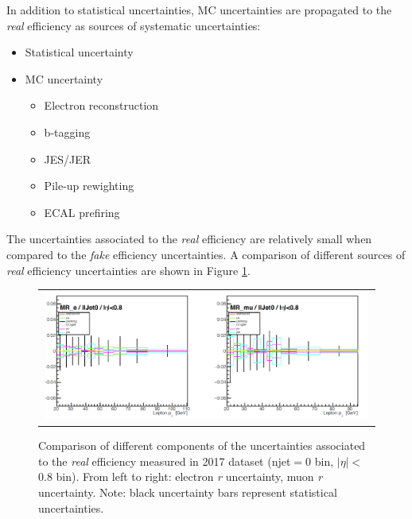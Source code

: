 In addition to statistical uncertainties, MC uncertainties are propagated to the \emph{real} efficiency as sources of systematic uncertainties:

\begin{itemize}
\item Statistical uncertainty 
\item MC uncertainty 
\begin{itemize}
\item Electron reconstruction 
\item b-tagging 
\item JES/JER
\item Pile-up rewighting 
\item ECAL prefiring 
\end{itemize}
\end{itemize}

The uncertainties associated to the \emph{real} efficiency are relatively small when compared to the \emph{fake} efficiency uncertainties. A comparison of different sources of \emph{real} efficiency uncertainties are shown in Figure \ref{fig:r_comp}.

\begin{figure}[tbh!]
 \begin{center}
 \begin{tabular}{c}
 \includegraphics[width=0.99\textwidth]{figures/Part3/Systematics/MR}
 \end{tabular}
 \caption{Comparison of different components of the uncertainties associated to the \emph{real} efficiency measured in 2017 dataset (njet$=$0 bin, $|\eta|<$0.8 bin). From left to right: electron \emph{r} uncertainty, muon \emph{r} uncertainty. Note: black uncertainty bars represent statistical uncertainties.}
 \label{fig:r_comp}
 \end{center}
\end{figure}

